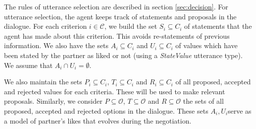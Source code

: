 \documentclass{llncs}
\begin{document}
		\medskip
		The rules of utterance selection are described in section \ref{sec:decision}. For  utterance selection, the agent keeps track of statements and proposals in the dialogue. For each criterion $i\in\mathcal{C}$, we build the set $S_i \subseteq C_i$ of statements that the agent has made about this criterion. This avoids re-statements of previous information. We also have the sets $A_i\subseteq C_i$ and $U_i\subseteq C_i$ of values which have been stated by the partner as liked or not (using a \emph{StateValue} utterance type). We assume that $A_i\cap U_i=\emptyset$.
		
		We also maintain the sets $P_i \subseteq C_i$, $T_i\subseteq C_i$ and $R_i\subseteq C_i$ of all proposed, accepted and rejected values for each criteria. These will be used to make relevant proposals. Similarly, we consider $P\subseteq \mathcal{O}$, $T\subseteq \mathcal{O}$ and $R\subseteq \mathcal{O}$ the sets of all proposed, accepted and rejected options in the dialogue.
		These sets $A_i,U_i$serve as a model of partner's likes that evolves during the negotiation. 
		 
\end{document}
